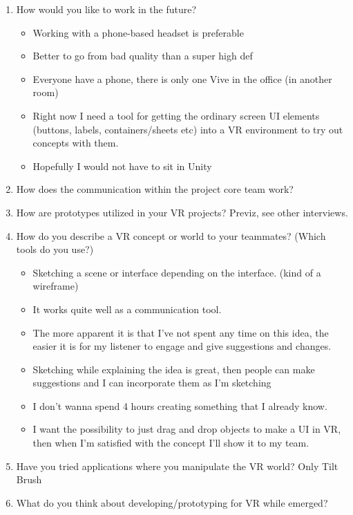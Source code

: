 \begin{enumerate}
\item How would you like to work in the future?
\begin{itemize}
\item Working with a phone-based headset is preferable
\item Better to go from bad quality than a super high def
\item Everyone have a phone, there is only one Vive in the office (in another room)
\item Right now I need a tool for getting the ordinary screen UI elements (buttons, labels, containers/sheets etc) into a VR environment to try out concepts with them.
\item Hopefully I would not have to sit in Unity
\end{itemize}
\item How does the communication within the project core team work?

\item How are prototypes utilized in your VR projects?
Previz, see other interviews.
\item How do you describe a VR concept or world to your teammates? (Which tools do you use?)
\begin{itemize}


\item Sketching a scene or interface depending on the interface. (kind of a wireframe)
\item It works quite well as a communication tool.
\item The more apparent it is that I've not spent any time on this idea, the easier it is for my listener to engage and give suggestions and changes.
\item Sketching while explaining the idea is great, then people can make suggestions and I can incorporate them as I'm sketching
\item I don't wanna spend 4 hours creating something that I already know.
\item I want the possibility to just drag and drop objects to make a UI in VR, then when I'm satisfied with the concept I'll show it to my team.

\end{itemize}
\item Have you tried applications where you manipulate the VR world?
Only Tilt Brush
\item What do you think about developing/prototyping for VR while emerged?
\begin{itemize}



\end{itemize}
\end{enumerate}
